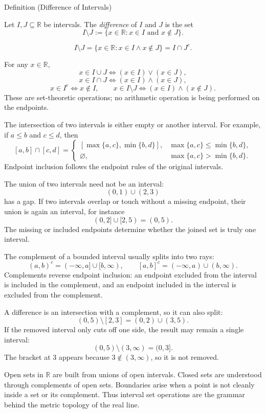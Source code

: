 \begin{definitionbox}{Definition (Difference of Intervals)}
\begin{definition}
\label{def:difference-of-intervals}
Let $I,J\subseteq\mathbb{R}$ be intervals.  The \emph{difference} of $I$ and
$J$ is the set
\[
  I\setminus J
  :=
  \{x\in\mathbb{R}:x\in I\text{ and }x\notin J\}.
\]
\end{definition}
\end{definitionbox}

\begin{remark*}
\[
I\setminus J=\{x\in\mathbb{R}:x\in I\land x\notin J\}=I\cap J^c.
\]
\end{remark*}

\begin{remark*}
For any $x\in\mathbb{R}$,
\[
x\in I\cup J \Longleftrightarrow (x\in I)\lor(x\in J),
\]
\[
x\in I\cap J \Longleftrightarrow (x\in I)\land(x\in J),
\]
\[
x\in I^c \Longleftrightarrow x\notin I,
\qquad
x\in I\setminus J \Longleftrightarrow (x\in I)\land(x\notin J).
\]
These are set-theoretic operations; no arithmetic operation is being performed
on the endpoints.
\end{remark*}

\begin{remark*}[Interpretation]
The intersection of two intervals is either empty or another interval. For
example, if $a\leq b$ and $c\leq d$, then
\[
[a,b]\cap[c,d]
=
\begin{cases}
[\max\{a,c\},\min\{b,d\}], & \max\{a,c\}\leq \min\{b,d\},\\
\varnothing, & \max\{a,c\}>\min\{b,d\}.
\end{cases}
\]
Endpoint inclusion follows the endpoint rules of the original intervals.


The union of two intervals need not be an interval:
\[
(0,1)\cup(2,3)
\]
has a gap. If two intervals overlap or touch without a missing endpoint, their
union is again an interval, for instance
\[
(0,2]\cup[2,5)=(0,5).
\]
The missing or included endpoints determine whether the joined set is truly
one interval.


The complement of a bounded interval usually splits into two rays:
\[
(a,b)^c=(-\infty,a]\cup[b,\infty),
\qquad
[a,b]^c=(-\infty,a)\cup(b,\infty).
\]
Complements reverse endpoint inclusion: an endpoint excluded from the interval
is included in the complement, and an endpoint included in the interval is
excluded from the complement.


A difference is an intersection with a complement, so it can also split:
\[
(0,5)\setminus[2,3]=(0,2)\cup(3,5).
\]
If the removed interval only cuts off one side, the result may remain a single
interval:
\[
(0,5)\setminus(3,\infty)=(0,3].
\]
The bracket at $3$ appears because $3\notin(3,\infty)$, so it is not removed.


Open sets in $\mathbb{R}$ are built from unions of open intervals. Closed sets
are understood through complements of open sets. Boundaries arise when a point
is not cleanly inside a set or its complement. Thus interval set operations are
the grammar behind the metric topology of the real line.
\end{remark*}

